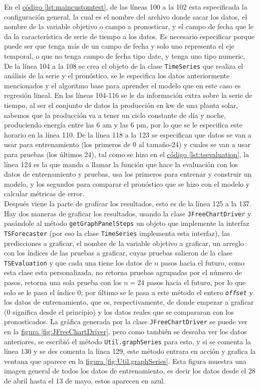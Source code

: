 En el \hyperref[lst:maincustomtest]{código \ref{lst:maincustomtest}}, de las líneas 100 a la 102 esta especificada la configuración general, la cual es el nombre del archivo donde sacar los datos, el nombre de la variable objetivo o campo a pronosticar, y el campo de fecha que le da la característica de serie de tiempo a los datos. Es necesario especificar porque puede ser que tenga más de un campo de fecha y solo uno representa el eje temporal, o que no tenga campo de fecha tipo date, y tenga uno tipo numeric.\\
De la línea 104 a la 108 se crea el objeto de la clase \texttt{TimeSeries} que realiza el análisis de la serie y el pronóstico, se le especifica los datos anteriormente mencionados y el algoritmo base para aprender el modelo que en este caso es regresión lineal. En las líneas 104-116 se le da información extra sobre la serie de tiempo, al ser el conjunto de datos la producción en kw de una planta solar, sabemos que la producción va a tener un ciclo constante de día y noche, produciendo energía entre las 6 am y las 6 pm, por lo que se le especifica este horario en la línea 110.	De la línea 118 a la 123 se especifican que datos se van a usar para entrenamiento (los primeros de 0 al tamaño-24) y cuales se van a usar para pruebas (los últimos 24), tal como se hizo en el \hyperref[lst:tsevaluation]{código \ref{lst:tsevaluation}}, la línea 124 es la que manda a llamar la función que hace la evaluación con los datos de entrenamiento y pruebas, usa los primeros para entrenar y construir un modelo, y los segundos para comparar el pronóstico que se hizo con el modelo y calcular métricas de error.\\
Después viene la parte de graficar los resultados, esto es de la línea 125 a la 137. Hay dos maneras de graficar los resultados, usando la clase \texttt{JFreeChartDriver} y pasándole al método \texttt{getGraphPanelSteps} un  objeto que implemente la interfaz \texttt{TSForecaster} (por eso la clase \texttt{TimeSeries} implementa esta interfaz), las predicciones a graficar, el nombre de la variable objetivo a graficar, un arreglo con los índices de las pruebas a graficar, cuyas pruebas salieron de la clase \texttt{TSEvaluation} y que cada una tiene los datos de $n$ pasos hacia el futuro, como esta clase esta personalizada, no retorna pruebas agrupadas por el número de pasos, retorna una sola prueba con los $n=24$ pasos hacia el futuro, por lo que solo se le pasa el índice 0; por último se le pasa a este método el entero \textit{\texttt{offset}} y los datos de entrenamiento, que es, respectivamente, de donde empezar a graficar (0 significa desde el principio) y los datos reales que se compararan con los pronosticados. La gráfica generada por la clase \texttt{JFreeChartDriver} se puede ver en la 
\hyperref[fig:JFreeChartDriver]{figura \ref{fig:JFreeChartDriver}}, 
pero como también se deseaba ver los datos anteriores, se escribió el método \texttt{Util.graphSeries} para esto, y si se comenta la línea 130 y se des comenta la línea 129, este método entrara en acción y grafica la ventana que aparece en la \hyperref[fig:Util.graphSeries]{figura \ref{fig:Util.graphSeries}}. Esta figura muestra una imagen general de todos los datos de entrenamiento, es decir los datos desde el 28 de abril hasta el 13 de mayo, estos aparecen en azul.

